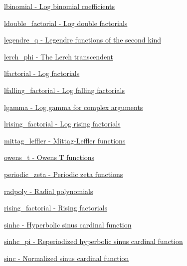 \begin{DoxyItemize}
\item \hyperlink{group__gnu__math__spec__func_gabfa5aeba56edfa110846fc8e76963bc2}{lbinomial -\/ Log binomial coefficients}
\item \hyperlink{group__gnu__math__spec__func_ga43bf9a20282d5b9237bf352682a48395}{ldouble\+\_\+factorial -\/ Log double factorials}
\item \hyperlink{group__gnu__math__spec__func_gadad5b22d0075dca31690907668af568f}{legendre\+\_\+q -\/ Legendre functions of the second kind}
\item \hyperlink{group__gnu__math__spec__func_ga31d7cfc601a99d72e58f654d0c890fd6}{lerch\+\_\+phi -\/ The Lerch transcendent}
\item \hyperlink{group__gnu__math__spec__func_gab256f8d7b77b9a8fefafca21827166eb}{lfactorial -\/ Log factorials}
\item \hyperlink{group__gnu__math__spec__func_ga2032c10640d5010666d60d9faec86c32}{lfalling\+\_\+factorial -\/ Log falling factorials}
\item \hyperlink{group__gnu__math__spec__func_ga40fa5127f7c419ed1d8f1c6a6f96ea9b}{lgamma -\/ Log gamma for complex arguments}
\item \hyperlink{group__gnu__math__spec__func_ga8912b75b2f7592fb61128c766e7313b9}{lrising\+\_\+factorial -\/ Log rising factorials}
\item \hyperlink{group__gnu__math__spec__func_ga1a51079e00fbe5473d8cf9ad3304c5c6}{mittag\+\_\+leffler -\/ Mittag-\/\+Leffler functions}
\item \hyperlink{group__gnu__math__spec__func_gab4e367aae19853cca3af99eead01fcaa}{owens\+\_\+t -\/ Owens T functions}
\item \hyperlink{group__gnu__math__spec__func_ga06b06216e87b868cb21c76d33ac560c8}{periodic\+\_\+zeta -\/ Periodic zeta functions}
\item \hyperlink{group__gnu__math__spec__func_ga195db2592888b7a8df870d9eaeff8d05}{radpoly -\/ Radial polynomials}
\item \hyperlink{group__gnu__math__spec__func_gae8c36a0e1f60254cf212a3806f7c675c}{rising\+\_\+factorial -\/ Rising factorials}
\item \hyperlink{group__gnu__math__spec__func_gaf2f02e4143e7beb97352cef4b7fcb663}{sinhc -\/ Hyperbolic sinus cardinal function}
\item \hyperlink{group__gnu__math__spec__func_ga8bb6034e28d48879845bf64818cc06e1}{sinhc\+\_\+pi -\/ Reperiodized hyperbolic sinus cardinal function}
\item \hyperlink{group__gnu__math__spec__func_ga09976b5d041113979c93613cc3700348}{sinc -\/ Normalized sinus cardinal function}

\end{DoxyItemize}
